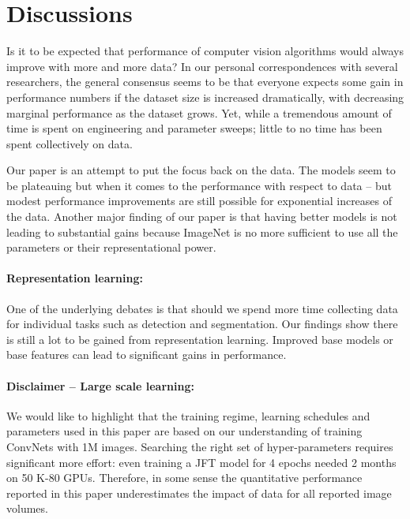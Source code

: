 \documentclass[10pt,twocolumn,letterpaper]{article}
\begin{document}
\section{Discussions}
Is it to be expected that performance of computer vision algorithms would always improve with more and more data? In our personal correspondences with several researchers, the general consensus seems to be that everyone expects some gain in performance numbers if the dataset size is increased dramatically, with decreasing marginal performance as the dataset grows. Yet, while a tremendous amount of time is spent on engineering and parameter sweeps; little to no time has been spent collectively on data. 

Our paper is an attempt to put the focus back on the data. The models seem to be plateauing but when it comes to the performance with respect to data -- but modest performance improvements are still possible for exponential increases of the data. Another major finding of our paper is that having better models is not leading to substantial gains because ImageNet is no more sufficient to use all the parameters or their representational power.

\vspace{-0.1in}
\paragraph{Representation learning:} One of the underlying debates is that should we spend more time collecting data for individual tasks such as detection and segmentation.
Our findings show there is still a lot to be gained from representation learning. Improved base models or base features can lead to significant gains in performance.

\vspace{-0.15in}
\paragraph{Disclaimer -- Large scale learning:} We would like to highlight that the training regime, learning schedules and parameters used in this paper are based on our understanding of training ConvNets with 1M images. Searching the right set of hyper-parameters requires significant more effort: even training a JFT model for 4 epochs needed 2 months on 50 K-80 GPUs. Therefore, in some sense the quantitative performance reported in this paper underestimates the impact of data for all reported image volumes.
\end{document}
